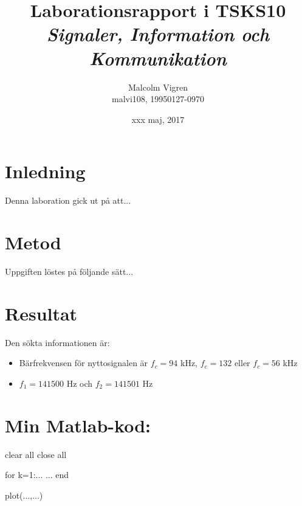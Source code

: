 \documentclass[10pt,twocolumn]{article}
\title{Laborationsrapport i TSKS10 \emph{Signaler, Information och Kommunikation}}
\author{Malcolm Vigren \\ malvi108, 19950127-0970 }
\date{xxx maj, 2017}
\begin{document}
\maketitle

\section{Inledning}

Denna laboration gick ut på att...

\section{Metod}

Uppgiften löstes på följande sätt...

\section{Resultat}

Den sökta informationen är:
\begin{itemize}
\item Bärfrekvensen för nyttosignalen är $f_c=94$ kHz, $f_c=132$ eller $f_c=56$ kHz
\item $f_1=141500$ Hz och $f_2=141501$ Hz
\end{itemize}

\clearpage

\section*{Min Matlab-kod:}
\begin{spverbatim}
clear all
close all

for k=1:...
  ...
end

plot(...,...)
\end{spverbatim}
\end{document}
